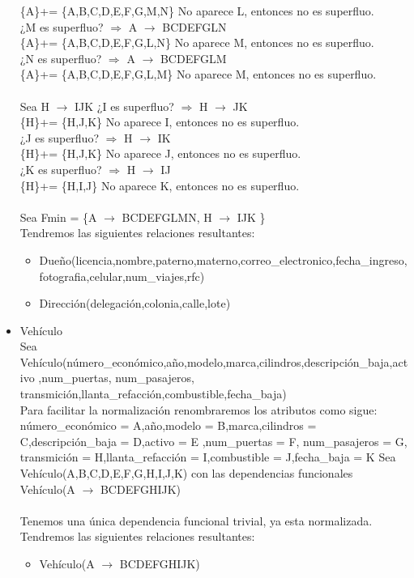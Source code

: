 \documentclass{article}
\begin{document}
\begin{itemize}
\{A\}+= \{A,B,C,D,E,F,G,M,N\}  No aparece L, entonces no es superfluo.\\
¿M es superfluo? $\Rightarrow$ A $\rightarrow$ BCDEFGLN \\
\{A\}+= \{A,B,C,D,E,F,G,L,N\}  No aparece M, entonces no es superfluo.\\
¿N es superfluo? $\Rightarrow$ A $\rightarrow$ BCDEFGLM \\
\{A\}+= \{A,B,C,D,E,F,G,L,M\}  No aparece M, entonces no es superfluo.\\
\\
Sea H $\rightarrow$ IJK 
¿I es superfluo? $\Rightarrow$ H $\rightarrow$ JK \\
\{H\}+= \{H,J,K\} No aparece I, entonces no es superfluo.\\
¿J es superfluo? $\Rightarrow$ H $\rightarrow$ IK \\
\{H\}+= \{H,J,K\} No aparece J, entonces no es superfluo.\\
¿K es superfluo? $\Rightarrow$ H $\rightarrow$ IJ \\
\{H\}+= \{H,I,J\} No aparece K, entonces no es superfluo.\\
\\
Sea Fmin = \{A $\rightarrow$ BCDEFGLMN, H $\rightarrow$ IJK  \}\\
Tendremos las siguientes relaciones resultantes:
\begin{itemize}
\item Dueño(licencia,nombre,paterno,materno,correo\_electronico,fecha\_ingreso, \\ fotografia,celular,num\_viajes,rfc)
\item Dirección(delegación,colonia,calle,lote)
\end{itemize}


\item Vehículo\\
Sea Vehículo(número\_económico,año,modelo,marca,cilindros,descripción\_baja,activo
,num\_puertas, num\_pasajeros, transmición,llanta\_refacción,combustible,fecha\_baja)\\
Para facilitar la normalización renombraremos los atributos como sigue:
número\_económico = A,año,modelo = B,marca,cilindros = C,descripción\_baja = D,activo = E
,num\_puertas = F, num\_pasajeros = G, transmición = H,llanta\_refacción = I,combustible = J,fecha\_baja = K
Sea Vehículo(A,B,C,D,E,F,G,H,I,J,K) con las dependencias funcionales
Vehículo(A $\rightarrow$ BCDEFGHIJK) \\
\\
Tenemos una única dependencia funcional trivial, ya esta normalizada.
Tendremos las siguientes relaciones resultantes:
\begin{itemize}
\item Vehículo(A $\rightarrow$ BCDEFGHIJK) \\
\end{itemize}




\end{itemize}
\end{document}
